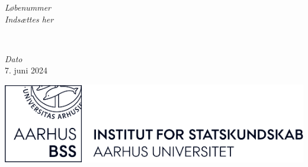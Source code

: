 
	\begin{minipage}{0.4\textwidth}
		\begin{flushleft}
			\large
			\textit{Løbenummer}\\
			\emph{Indsættes her}\\
		\end{flushleft}
	\end{minipage}
	~
	\begin{minipage}{0.4\textwidth}
		\begin{flushright}
			\large
			\textit{Dato}\\
			7. juni 2024
		\end{flushright}
	\end{minipage}





	\vfill\vfill
	\includegraphics[width=4\textwidth]{format/images/ifsk-logo-black.png}\\[1cm] %
